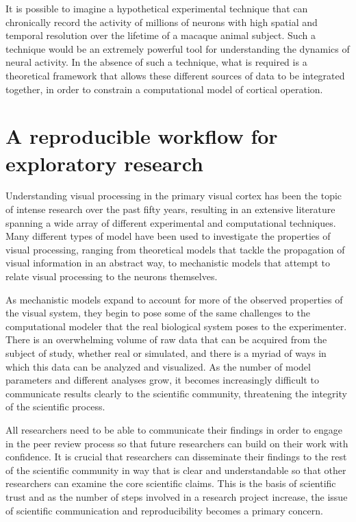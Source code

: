 \documentclass[phd,ianc,twoside]{infthesis}
\begin{document}
It is possible to imagine a hypothetical experimental technique that can
chronically record the activity of millions of neurons with high spatial
and temporal resolution over the lifetime of a macaque animal
subject. Such a technique would be an extremely powerful tool for
understanding the dynamics of neural activity. In the absence of such a
technique, what is required is a theoretical framework that allows these
different sources of data to be integrated together, in order to
constrain a computational model of cortical operation.



\chapter{A reproducible workflow for exploratory research}
\label{chapter:reproducible_workflow}

Understanding visual processing in the primary visual cortex has been
the topic of intense research over the past fifty years, resulting in an
extensive literature spanning a wide array of different experimental and
computational techniques. Many different types of model have been used
to investigate the properties of visual processing, ranging from
theoretical models that tackle the propagation of visual information in
an abstract way, to mechanistic models that attempt to relate visual
processing to the neurons themselves.

As mechanistic models expand to account for more of the observed
properties of the visual system, they begin to pose some of the same
challenges to the computational modeler that the real biological system
poses to the experimenter. There is an overwhelming volume of raw
data that can be acquired from the subject of study, whether real or
simulated, and there is a myriad of ways in which this data can be
analyzed and visualized. As the number of model parameters and different
analyses grow, it becomes increasingly difficult to communicate results
clearly to the scientific community, threatening the integrity of the
scientific process.

All researchers need to be able to communicate their findings in order
to engage in the peer review process so that future researchers can
build on their work with confidence. It is crucial that researchers can
disseminate their findings to the rest of the scientific community in
way that is clear and understandable so that other researchers can
examine the core scientific claims. This is the basis of scientific
trust and as the number of steps involved in a research project
increase, the issue of scientific communication and reproducibility
becomes a primary concern.
\end{document}
